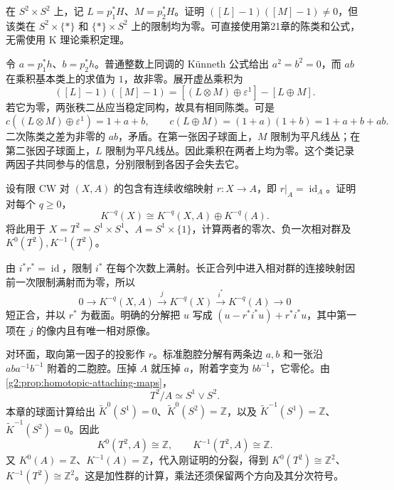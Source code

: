 \begin{exercise}\label{g2:ex:k-external-product-visible-chern}
	在 \(S^2\times S^2\) 上，记 \(L=p_1^*H\)、\(M=p_2^*H\)。证明 \(([L]-1)([M]-1)\ne0\)，但该类在 \(S^2\times\{*\}\) 和 \(\{*\}\times S^2\) 上的限制均为零。可直接使用第21章的陈类和公式，无需使用 K 理论乘积定理。
\end{exercise}
\begin{solution}
	令 \(a=p_1^*h\)、\(b=p_2^*h\)。普通整数上同调的 K\"unneth 公式给出 \(a^2=b^2=0\)，而 \(ab\) 在乘积基本类上的求值为 \(1\)，故非零。展开虚丛乘积为
	\[
		([L]-1)([M]-1)=[(L\otimes M)\oplus\varepsilon^1]-[L\oplus M].
	\]
	若它为零，两张秩二丛应当稳定同构，故具有相同陈类。可是
	\[
		c((L\otimes M)\oplus\varepsilon^1)=1+a+b,
		\qquad c(L\oplus M)=(1+a)(1+b)=1+a+b+ab.
	\]
	二次陈类之差为非零的 \(ab\)，矛盾。在第一张因子球面上，\(M\) 限制为平凡线丛；在第二张因子球面上，\(L\) 限制为平凡线丛。因此乘积在两者上均为零。这个类记录两因子共同参与的信息，分别限制到各因子会失去它。
\end{solution}

\begin{exercise}\label{g2:ex:k-retraction-torus}
	设有限 CW 对 \((X,A)\) 的包含有连续收缩映射 \(r:X\to A\)，即 \(r|_A=\operatorname{id}_A\)。证明对每个 \(q\ge0\)，
	\[
		K^{-q}(X)\cong K^{-q}(X,A)\oplus K^{-q}(A).
	\]
	将此用于 \(X=T^2=S^1\times S^1\)、\(A=S^1\times\{1\}\)，计算两者的零次、负一次相对群及 \(K^0(T^2),K^{-1}(T^2)\)。
\end{exercise}
\begin{solution}
	由 \(i^*r^*=\operatorname{id}\)，限制 \(i^*\) 在每个次数上满射。长正合列中进入相对群的连接映射因前一次限制满射而为零，所以
	\[
		0\longrightarrow K^{-q}(X,A)\xrightarrow{j}K^{-q}(X)
		\xrightarrow{i^*}K^{-q}(A)\longrightarrow0
	\]
	短正合，并以 \(r^*\) 为截面。明确的分解把 \(u\) 写成 \((u-r^*i^*u)+r^*i^*u\)，其中第一项在 \(j\) 的像内且有唯一相对原像。

	对环面，取向第一因子的投影作 \(r\)。标准胞腔分解有两条边 \(a,b\) 和一张沿 \(aba^{-1}b^{-1}\) 附着的二胞腔。压掉 \(A\) 就压掉 \(a\)，附着字变为 \(bb^{-1}\)，它零伦。由\cref{g2:prop:homotopic-attaching-maps}，
	\[
		T^2/A\simeq S^1\vee S^2.
	\]
	本章的球面计算给出 \(\widetilde K^0(S^1)=0\)、\(\widetilde K^0(S^2)=\mathbb Z\)，以及 \(\widetilde K^{-1}(S^1)=\mathbb Z\)、\(\widetilde K^{-1}(S^2)=0\)。因此
	\[
		K^0(T^2,A)\cong\mathbb Z,\qquad K^{-1}(T^2,A)\cong\mathbb Z.
	\]
	又 \(K^0(A)=\mathbb Z\)、\(K^{-1}(A)=\mathbb Z\)，代入刚证明的分裂，得到 \(K^0(T^2)\cong\mathbb Z^2\)、\(K^{-1}(T^2)\cong\mathbb Z^2\)。这是加性群的计算，乘法还须保留两个方向及其分次符号。
\end{solution}

